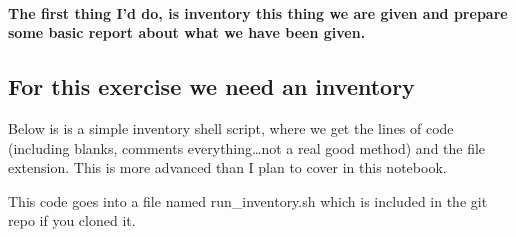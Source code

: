 \documentclass{article}
\begin{document}
\paragraph{The first thing I'd do, is inventory this thing we are given
and prepare some basic report about what we have been
given.}\label{the-first-thing-id-do-is-inventory-this-thing-we-are-given-and-prepare-some-basic-report-about-what-we-have-been-given.}

    \subsection{For this exercise we need an
inventory}\label{for-this-exercise-we-need-an-inventory}

Below is is a simple inventory shell script, where we get the lines of
code (including blanks, comments everything\ldots{}not a real good
method) and the file extension. This is more advanced than I plan to
cover in this notebook.

This code goes into a file named run\_inventory.sh which is included in
the git repo if you cloned it.
\end{document}
